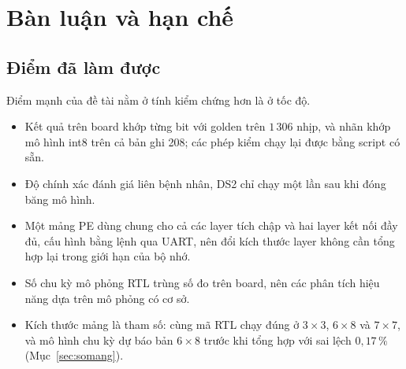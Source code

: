 \section{Bàn luận và hạn chế}\label{sec:banluan}
\subsection{Điểm đã làm được}
Điểm mạnh của đề tài nằm ở tính kiểm chứng hơn là ở tốc độ.
\begin{itemize}
  \item Kết quả trên board khớp từng bit với golden trên $1\,306$ nhịp, và nhãn khớp mô hình int8 trên cả bản ghi 208; các phép kiểm chạy lại được bằng script có sẵn.
  \item Độ chính xác đánh giá liên bệnh nhân, DS2 chỉ chạy một lần sau khi đóng băng mô hình.
  \item Một mảng PE dùng chung cho cả các layer tích chập và hai layer kết nối đầy đủ, cấu hình bằng lệnh qua UART, nên đổi kích thước layer không cần tổng hợp lại trong giới hạn của bộ nhớ.
  \item Số chu kỳ mô phỏng RTL trùng số đo trên board, nên các phân tích hiệu năng dựa trên mô phỏng có cơ sở.
  \item Kích thước mảng là tham số: cùng mã RTL chạy đúng ở $3\times3$, $6\times8$ và $7\times7$, và mô hình chu kỳ dự báo bản $6\times8$ trước khi tổng hợp với sai lệch $0{,}17\,\%$ (Mục~\ref{sec:somang}).
\end{itemize}

